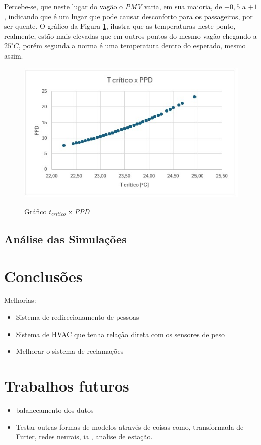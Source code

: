 \documentclass[acronym,symbols,table]{fei}
\begin{document}
Percebe-se, que neste lugar do vagão o \textit{PMV} varia, em sua maioria, de $+0,5$ a $+1$, indicando que é um lugar que pode causar desconforto para os passageiros, por ser quente. O gráfico da Figura \ref{fig:tcritico-ppd}, ilustra que as temperaturas neste ponto, realmente, estão mais elevadas que em outros pontos do mesmo vagão chegando a $25^\circ C$, porém segunda a norma é uma temperatura dentro do esperado, mesmo assim.

\begin{figure}[!htb]
    \centering
    \caption{Gráfico $t_{critico}$ x \textit{PPD}}
    \includegraphics[width=0.8\linewidth]{Imagens/tcritico-ppd.jpeg}
    \label{fig:tcritico-ppd}
\end{figure}

\section{Análise das Simulações}

\chapter{Conclusões}

Melhorias: 
\begin{itemize}
 \item  Sistema de redirecionamento de pessoas
 \item  Sistema de HVAC que tenha relação direta com os sensores de peso
 \item  Melhorar o sistema de reclamações
\end{itemize}

\chapter{Trabalhos futuros}

\begin{itemize}
\item   balanceamento dos dutos
\item   Testar outras formas de modelos através de coisas como, transformada de Furier, redes neurais, ia , analise de estação.
\end{itemize}

\printbibliography
\end{document}
